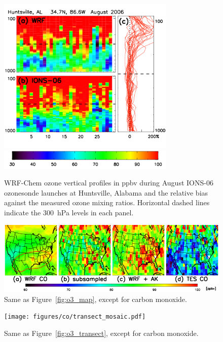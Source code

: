  \begin{figure}
 \noindent\includegraphics[width=20pc]{figures/o3/ions_huntsville.png} \\
 \noindent\includegraphics[width=20pc]{figures/o3/o3_colorbar.png}
 \caption{WRF-Chem ozone vertical profiles in ppbv during August IONS-06 ozonesonde launches at
Huntsville, Alabama and the relative bias against the measured ozone mixing ratios. Horizontal
dashed lines indicate the 300~hPa levels in each panel.}
 \label{fig:huntsville}
 \end{figure}

 \begin{figure}
 \noindent\includegraphics[width=40pc]{figures/co/tes08_co.png}
 \caption{Same as Figure~\ref{fig:o3_map}, except for carbon monoxide.}
 \label{fig:co_map}
 \end{figure}

 \begin{figure}
 \texttt{[image: figures/co/transect\_mosaic.pdf]}
 \caption{Same as Figure~\ref{fig:o3_transect}, except for carbon monoxide.}
 \label{fig:co_transect}
 \end{figure}

